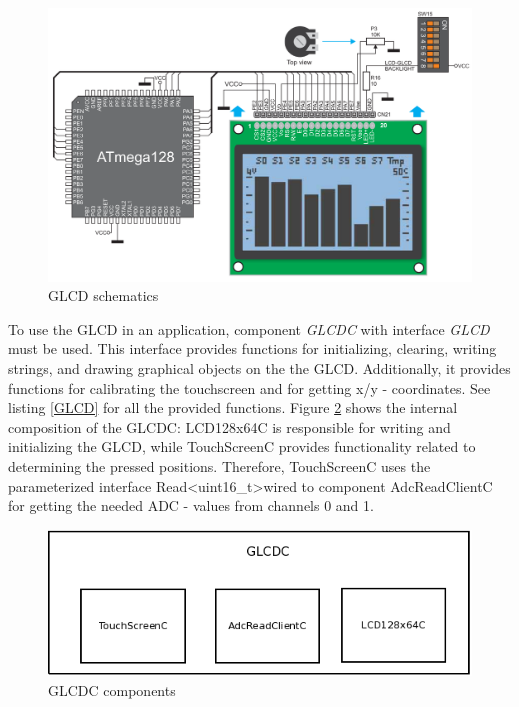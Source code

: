 \begin{figure}[h]
 \centerline{\includegraphics[width=.8\columnwidth]{pics/GLCD.png}}
  \caption{GLCD schematics}
  \label{fig:glcd}
\end{figure}

To use the GLCD in an application, component \textit{GLCDC} with interface \textit{GLCD} must be used. This interface provides functions for initializing, clearing, writing strings, and drawing graphical objects on the the GLCD. Additionally, it provides functions for calibrating the touchscreen and for getting x/y - coordinates. See listing \ref{GLCD} for all the provided functions. Figure \ref{fig:glcdc} shows the internal composition of the GLCDC: LCD128x64C is responsible for writing and initializing the GLCD, while TouchScreenC provides functionality related to determining the pressed positions. Therefore, TouchScreenC uses the parameterized interface Read\textless uint16\_t\textgreater wired to component AdcReadClientC for getting the needed ADC - values from channels 0 and 1.



\begin{figure}[h]
 \centerline{\includegraphics[width=.8\columnwidth]{pics/GLCDC.png}}
  \caption{GLCDC components}
  \label{fig:glcdc}
\end{figure}



